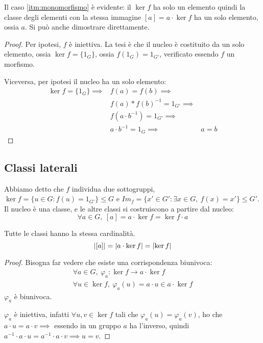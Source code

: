 Il caso \ref{itm:monomorfismo} \`e evidente: il $\ker f$ ha solo un elemento quindi la classe degli elementi con la stessa immagine $[a] = a \cdot \ker f$ ha un solo elemento, ossia $a$. Si pu\`o anche dimostrare direttamente.
\begin{proof}
Per ipotesi, $f$ \`e iniettiva. La tesi \`e che il nucleo \`e costituito da un solo elemento, ossia $\ker f = \{ 1_G \} $, ossia $f(1_G) = 1_{G'}$, verificato essendo $f$ un morfismo.

Viceversa, per ipotesi il nucleo ha un solo elemento:
\begin{align*}
\ker f = \{ 1_G \} \implies & f(a) = f(b) \implies & \\
 & f(a) \ast f(b)^{-1} = 1_{G'} \implies & \\
 & f(a \cdot b^{-1}) = 1_{G'} \implies & \\ 
 & a \cdot b^{-1} = 1_G \implies & a = b
\end{align*}
\end{proof}

\subsection{Classi laterali}

Abbiamo detto che $f$ individua due sottogruppi, $\ker f = \{ u \in G : f(u) = 1_{G'} \} \le G$ e $Im_f = \{ x' \in G' : \exists x \in G , \ f(x) = x'\} \le G'$. Il nucleo \`e una classe, e le altre classi si costruiscono a partire dal nucleo:
\[
\forall a \in G , \ [a] = a \cdot \ker f = \ker f \cdot a
\]
\begin{prop}
Tutte le classi hanno la stessa cardinalit\`a.
\[
\left\lvert{[a]}\right\rvert = \left\lvert{a \cdot \ker f}\right\rvert = \left\lvert{\ker f}\right\rvert
\]
\end{prop}
\begin{proof}
Bisogna far vedere che esiste una corrispondenza biunivoca:
\begin{gather*}
\forall a \in G , \ \varphi_a : \ker f \to a \cdot \ker f \\
\forall u \in \ker f , \ \varphi_a (u) = a \cdot u \in a \cdot \ker f
\end{gather*}
$\varphi_a$ \`e biunivoca. 

$\varphi_a$ \`e iniettiva, infatti $\forall u, v \in \ker f $ tali che $\varphi_a (u) = \varphi_a (v)$, ho che $a \cdot u = a \cdot v \implies$ essendo in un gruppo $a$ ha l'inverso, quindi $a^{-1} \cdot a \cdot u = a^{-1} \cdot a \cdot v \implies u = v$.
\end{proof}

